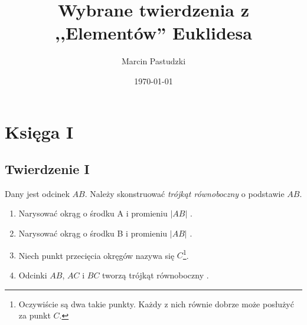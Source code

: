 \documentclass[12pt, a4paper]{article}
\title{Wybrane twierdzenia z ,,Elementów'' Euklidesa}
\author{Marcin Pastudzki}
\date{\today}
\begin{document}
\section*{Księga I}
\subsection*{Twierdzenie I}

Dany jest odcinek $AB$. Należy skonstruować \emph{trójkąt równoboczny} o
podstawie $AB$.

\begin{figure}[h!]
    \begin{center}
    \end{center}
\end{figure}

\begin{enumerate}
    \item Narysować okrąg o środku A i promieniu $|AB|$ .
    \item Narysować okrąg o środku B i promieniu $|AB|$ .
    \item Niech punkt przecięcia okręgów nazywa się $C$\footnote{
        Oczywiście są dwa takie punkty. Każdy z nich równie dobrze może posłużyć
        za punkt $C$.
    }.
    \item Odcinki $AB$, $AC$ i $BC$ tworzą trójkąt równoboczny .
\end{enumerate}

\end{document}
